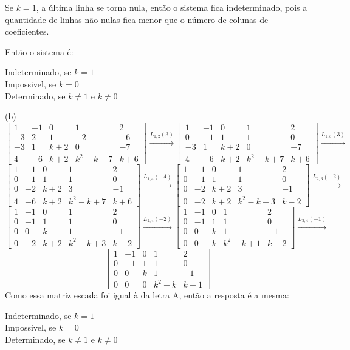 \documentclass{homework}
\begin{document}
Se $k=1$, a última linha se torna nula, então o sistema fica indeterminado, pois a quantidade de linhas não nulas fica menor que o número de colunas de coeficientes.

Então o sistema é:

\begin{center}
Indeterminado, se $k=1$\\
Impossivel, se $k=0$\\
Determinado, se $k\neq1$ e $k\neq0$
\end{center}

(b)
\[\left[\begin{array}{cccc|c}
1 & -1 & 0 & 1 & 2\\
-3 & 2 & 1 & -2 & -6\\
-3 & 1 & k+2 & 0 & -7\\
4 & -6 & k+2 & k^2-k+7 & k+6
\end{array}\right] \xrightarrow{L_{1,2}(3)}
\left[\begin{array}{cccc|c}
1 & -1 & 0 & 1 & 2\\
0 & -1 & 1 & 1 & 0\\
-3 & 1 & k+2 & 0 & -7\\
4 & -6 & k+2 & k^2-k+7 & k+6
\end{array}\right] \xrightarrow{L_{1,3}(3)}\]
\[\left[\begin{array}{cccc|c}
1 & -1 & 0 & 1 & 2\\
0 & -1 & 1 & 1 & 0\\
0 & -2 & k+2 & 3 & -1\\
4 & -6 & k+2 & k^2-k+7 & k+6
\end{array}\right] \xrightarrow{L_{1,4}(-4)}
\left[\begin{array}{cccc|c}
1 & -1 & 0 & 1 & 2\\
0 & -1 & 1 & 1 & 0\\
0 & -2 & k+2 & 3 & -1\\
0 & -2 & k+2 & k^2-k+3 & k-2
\end{array}\right] \xrightarrow{L_{2,3}(-2)}\]
\[\left[\begin{array}{cccc|c}
1 & -1 & 0 & 1 & 2\\
0 & -1 & 1 & 1 & 0\\
0 & 0 & k & 1 & -1\\
0 & -2 & k+2 & k^2-k+3 & k-2
\end{array}\right] \xrightarrow{L_{2,4}(-2)}
\left[\begin{array}{cccc|c}
1 & -1 & 0 & 1 & 2\\
0 & -1 & 1 & 1 & 0\\
0 & 0 & k & 1 & -1\\
0 & 0 & k & k^2-k+1 & k-2
\end{array}\right] \xrightarrow{L_{3,4}(-1)}\]
\[\left[\begin{array}{cccc|c}
1 & -1 & 0 & 1 & 2\\
0 & -1 & 1 & 1 & 0\\
0 & 0 & k & 1 & -1\\
0 & 0 & 0 & k^2-k & k-1
\end{array}\right]\]
Como essa matriz escada foi igual à da letra A, então a resposta é a mesma:

\begin{center}
Indeterminado, se $k=1$\\
Impossivel, se $k=0$\\
Determinado, se $k\neq1$ e $k\neq0$
\end{center}
\end{document}

